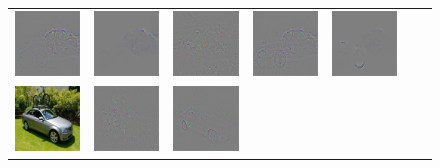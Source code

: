 \begin{figure}
\begin{center}
\begin{tabular}{ccccccc}
\includegraphics[width=0.14\linewidth,height=0.115\linewidth]{figs/examples/googlenet/deconv/bic-car1_diff_818} &
\includegraphics[width=0.14\linewidth,height=0.115\linewidth]{figs/examples/googlenet/soft/bic-car1_diff_818} &
\includegraphics[width=0.14\linewidth,height=0.115\linewidth]{figs/examples/googlenet/oxford/bic-car1_diff_672} &
\includegraphics[width=0.14\linewidth,height=0.115\linewidth]{figs/examples/googlenet/deconv/bic-car1_diff_672} &
\includegraphics[width=0.14\linewidth,height=0.115\linewidth]{figs/examples/googlenet/soft/bic-car1_diff_672} \\
\vspace{-2.5pt}
\includegraphics[width=0.14\linewidth,height=0.115\linewidth]{figs/examples/googlenet/oxford/bic-car2} &
\includegraphics[width=0.14\linewidth,height=0.115\linewidth]{figs/examples/googlenet/oxford/bic-car2_diff_818} &
\includegraphics[width=0.14\linewidth,height=0.115\linewidth]{figs/examples/googlenet/deconv/bic-car2_diff_818} &

\end{tabular}
\end{center}
\end{figure}
